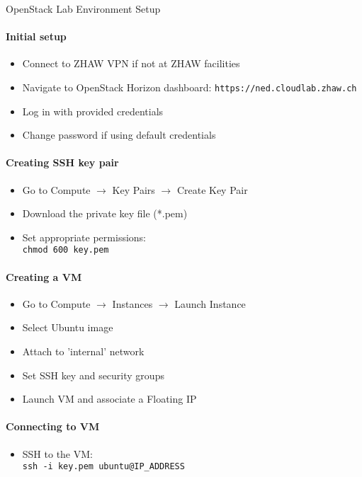 \begin{KR}{OpenStack Lab Environment Setup}
    \paragraph{Initial setup}
    \begin{itemize}
        \item Connect to ZHAW VPN if not at ZHAW facilities
        \item Navigate to OpenStack Horizon dashboard: \texttt{https://ned.cloudlab.zhaw.ch}
        \item Log in with provided credentials
        \item Change password if using default credentials
    \end{itemize}
    
    \paragraph{Creating SSH key pair}
    \begin{itemize}
        \item Go to Compute $\rightarrow$ Key Pairs $\rightarrow$ Create Key Pair
        \item Download the private key file (*.pem)
        \item Set appropriate permissions: \\ \texttt{chmod 600 key.pem}
    \end{itemize}
    
    \paragraph{Creating a VM}
    \begin{itemize}
        \item Go to Compute $\rightarrow$ Instances $\rightarrow$ Launch Instance
        \item Select Ubuntu image
        \item Attach to 'internal' network
        \item Set SSH key and security groups
        \item Launch VM and associate a Floating IP
    \end{itemize}
    
    \paragraph{Connecting to VM}
    \begin{itemize}
        \item SSH to the VM: \\ \texttt{ssh -i key.pem ubuntu@IP\_ADDRESS}
    \end{itemize}
\end{KR}

